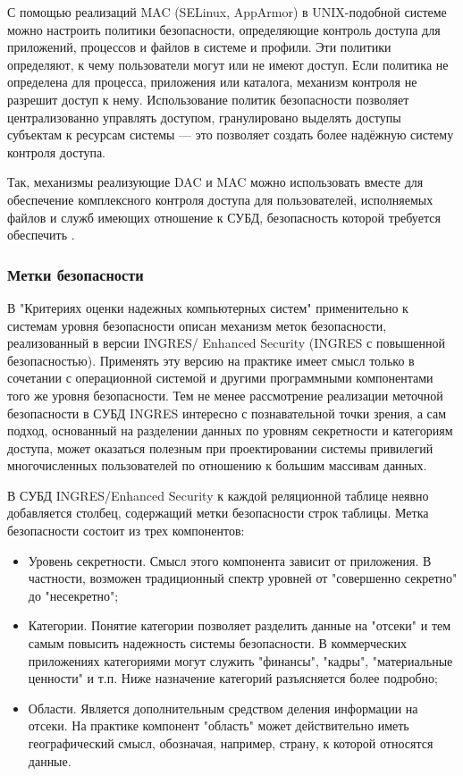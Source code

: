 С помощью реализаций MAC (SELinux, AppArmor) в UNIX-подобной системе можно настроить политики безопасности,
определяющие контроль доступа для приложений, процессов и файлов в системе и профили. Эти политики
определяют, к чему пользователи могут или не имеют доступ. Если политика не определена для процесса,
приложения или каталога, механизм контроля не разрешит доступ к нему.
Использование политик безопасности позволяет централизованно управлять доступом, гранулировано
выделять доступы субъектам к ресурсам системы — это позволяет создать более надёжную систему
контроля доступа.

Так, механизмы реализующие DAC и MAC можно использовать вместе для обеспечение комплексного контроля доступа
для пользователей, исполняемых файлов и служб имеющих отношение к СУБД, безопасность которой требуется
обеспечить \cite{selinux-apparmor}.


\subsubsection{Метки безопасности}

В "Критериях оценки надежных компьютерных систем" применительно к системам уровня безопасности
описан механизм меток безопасности, реализованный в версии INGRES/ Enhanced Security (INGRES с
повышенной безопасностью). Применять эту версию на практике имеет смысл только в сочетании с
операционной системой и другими программными компонентами того же уровня безопасности. Тем не менее
рассмотрение реализации меточной безопасности в СУБД INGRES интересно с познавательной точки
зрения, а сам подход, основанный на разделении данных по уровням секретности и категориям доступа,
может оказаться полезным при проектировании системы привилегий многочисленных пользователей по
отношению к большим массивам данных.

В СУБД INGRES/Enhanced Security к каждой реляционной таблице неявно добавляется столбец, содержащий
метки безопасности строк таблицы. Метка безопасности состоит из трех компонентов:
\begin{itemize}
    \item Уровень секретности. Смысл этого компонента зависит от приложения. В частности, возможен
        традиционный спектр уровней от "совершенно секретно" до "несекретно";
    \item Категории. Понятие категории позволяет разделить данные на "отсеки" и тем самым повысить
        надежность системы безопасности. В коммерческих приложениях категориями могут служить
        "финансы", "кадры", "материальные ценности" и т.п. Ниже назначение категорий разъясняется
        более подробно;
    \item Области. Является дополнительным средством деления информации на отсеки. На практике
        компонент "область" может действительно иметь географический смысл, обозначая, например,
        страну, к которой относятся данные.
\end{itemize}

